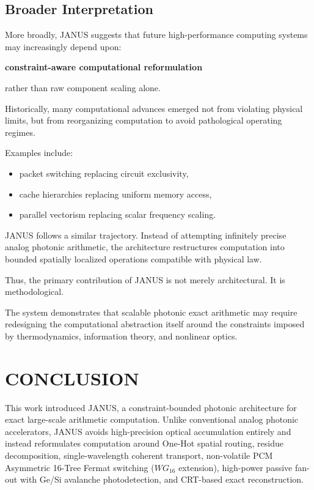 \documentclass[journal]{IEEEtran}
\begin{document}
\subsection{\textbf{Broader Interpretation}}

More broadly, JANUS suggests that future high-performance computing systems may increasingly depend upon:

\begin{center}
\textbf{constraint-aware computational reformulation}
\end{center}

rather than raw component scaling alone.

Historically, many computational advances emerged not from violating physical limits, but from reorganizing computation to avoid pathological operating regimes.

Examples include:
\begin{itemize}
\item  packet switching replacing circuit exclusivity,
\item  cache hierarchies replacing uniform memory access,
\item  parallel vectorism replacing scalar frequency scaling.
\end{itemize}

JANUS follows a similar trajectory. Instead of attempting infinitely precise analog photonic arithmetic, the architecture restructures computation into bounded spatially localized operations compatible with physical law. 

Thus, the primary contribution of JANUS is not merely architectural. It is methodological.

The system demonstrates that scalable photonic exact arithmetic may require redesigning the computational abstraction itself around the constraints imposed by thermodynamics, information theory, and nonlinear optics.

\section{CONCLUSION}

This work introduced JANUS, a constraint-bounded photonic architecture for exact large-scale arithmetic computation. Unlike conventional analog photonic accelerators, JANUS avoids high-precision optical accumulation entirely and instead reformulates computation around One-Hot spatial routing, residue decomposition, single-wavelength coherent transport, non-volatile PCM Asymmetric 16-Tree Fermat switching ($WG_{16}$ extension), high-power passive fan-out with Ge/Si avalanche photodetection, and CRT-based exact reconstruction.
\end{document}
